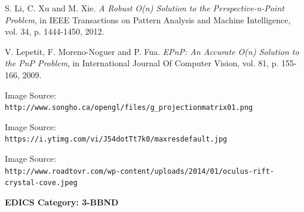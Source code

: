 \documentclass[journal]{IEEEtran}
\begin{document}
\begin{thebibliography}{10}
	
	S. Li, C. Xu and M. Xie. \textit{A Robust O(n) Solution to the Perspective-n-Point Problem}, in IEEE Transactions on Pattern Analysis and Machine Intelligence, vol. 34, p. 1444-1450, 2012.
	
	V. Lepetit, F. Moreno-Noguer and P. Fua. \textit{EPnP: An Accurate O(n) Solution to the PnP Problem}, in International Journal Of Computer Vision, vol. 81, p. 155-166, 2009.

	Image Source: \\\texttt{http://www.songho.ca/opengl/files/g\_projectionmatrix01.png}
	
	Image Source: \\\texttt{https://i.ytimg.com/vi/J54dotTt7k0/maxresdefault.jpg}
	
	
	Image Source: \\\texttt{http://www.roadtovr.com/wp-content/uploads/2014/01/oculus-rift-crystal-cove.jpeg}

\end{thebibliography}

 \ifCLASSOPTIONpeerreview
 \begin{center} \bfseries EDICS Category: 3-BBND \end{center}
 \fi



\IEEEpeerreviewmaketitle




   
\end{document}

